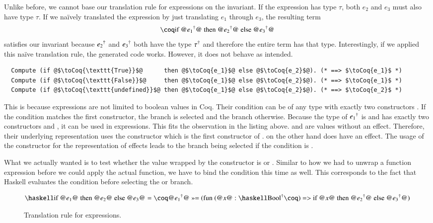 Unlike before, we cannot base our translation rule for  expressions on the invariant.
If the expression  has type $\tau$, both $e_2$ and $e_3$ must also have type $\tau$.
If we naïvely translated the expression by just translating $e_1$ through $e_3$, the resulting term
\[
  \coqM{if @$\toCoqX{e_1}$@ then @$\toCoqX{e_2}$@ else @$\toCoqX{e_3}$@}
\]
satisfies our invariant because ${e_2}^{\dagger}$ and ${e_3}^{\dagger}$ both have the type ${\tau}^{\dagger}$ and therefore the entire term has that type.
Interestingly, if we applied this naïve translation rule, the generated code works.
However, it does not behave as intended.
\begin{verbatim}
  Compute (if @$\toCoq{\texttt{True}}$@      then @$\toCoq{e_1}$@ else @$\toCoq{e_2}$@). (* ==> $\toCoq{e_1}$ *)
  Compute (if @$\toCoq{\texttt{False}}$@     then @$\toCoq{e_1}$@ else @$\toCoq{e_2}$@). (* ==> $\toCoq{e_1}$ *)
  Compute (if @$\toCoq{\texttt{undefined}}$@ then @$\toCoq{e_1}$@ else @$\toCoq{e_2}$@). (* ==> $\toCoq{e_2}$ *)
\end{verbatim}
This is because  expressions are not limited to boolean values in Coq.
Their condition can be of any type with exactly two constructors \cite[p.~48]{CoqDevTeam:2018}.
If the condition matches the first constructor, the  branch is selected and the  branch otherwise.
Because the type of ${e_1}^{\dagger}$ is  and  has exactly two constructors  and , it can be used in  expressions.
This fits the observation in the listing above.
 and  are values without an effect.
Therefore, their underlying representation uses the  constructor which is the first constructor of .
 on the other hand does have an effect.
The usage of the  constructor for the representation of effects leads to the  branch being selected if the condition is .

What we actually wanted is to test whether the value wrapped by the  constructor is  or .
Similar to how we had to unwrap a function expression before we could apply the actual function, we have to bind the condition this time as well.
This corresponds to the fact that Haskell evaluates the condition before selecting the  or  branch.

\begin{figure}[H]
  \[
    \haskellM{if @$e_1$@ then @$e_2$@ else @$e_3$@}
      = \coqM{@$\toCoqX{e_1}$@ >>= (fun (@$x$@ :}\;\toCoq{\haskellM{Bool}}\coqM{) => if @$x$@ then @$\toCoqX{e_2}$@ else @$\toCoqX{e_3}$@)}
  \]
  \caption{Translation rule for  expressions.}
  \label{fig:translation:expr:if}
\end{figure}

